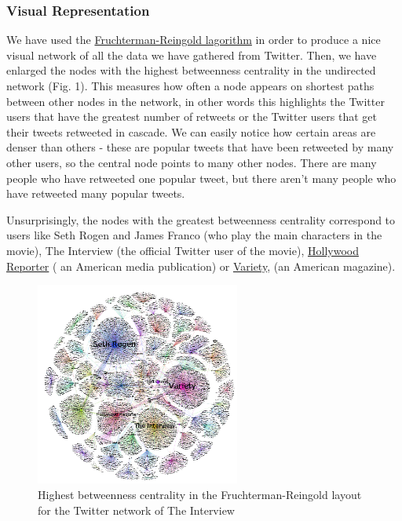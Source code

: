 \documentclass{llncs}
\begin{document}
\subsubsection{Visual Representation}
We have used the
\href{https://en.wikipedia.org/wiki/Force-directed_graph_drawing}{Fruchterman-Reingold
lagorithm} in order to produce a nice visual network of all the data we have
gathered from Twitter. Then, we have enlarged the nodes with the highest
betweenness centrality in the undirected network (Fig. 1). This measures how often a node
appears on shortest paths between other nodes in the network, in other words
this highlights the Twitter users that have the greatest number of retweets or
the Twitter users that get their tweets retweeted in cascade. We can easily
notice how certain areas are denser than others - these are popular tweets that
have been retweeted by many other users, so the central node points to many
other nodes. There are many people who have retweeted one popular tweet, but
there aren't many people who have retweeted many popular tweets.

Unsurprisingly, the nodes with the greatest betweenness centrality correspond to
users like Seth Rogen and James Franco (who play the main characters in the
movie), The Interview (the official Twitter user of the movie),
\href{http://en.wikipedia.org/wiki/The_Hollywood_Reporter}{Hollywood Reporter} (
an American media publication) or
\href{http://en.wikipedia.org/wiki/Variety_%28magazine%29 }{Variety}, (an
American magazine).
%
\begin{figure}
\centering
\includegraphics[width=0.6\textwidth]{interview-twitter-betweennes-centrality.png}
\caption{Highest betweenness centrality in the Fruchterman-Reingold layout for
the Twitter network of The Interview}
\end{figure}
%
\end{document}
